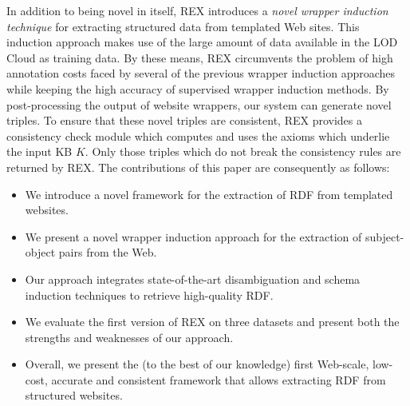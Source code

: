 In addition to being novel in itself, REX introduces a \emph{novel wrapper induction technique} for extracting structured data from templated Web sites. 
This induction approach makes use of the large amount of data available in the \ac{LOD} Cloud as training data. 
By these means, REX circumvents the problem of high annotation costs faced by several of the previous wrapper induction approaches~\cite{flesca2004web,Hogue:2005:TAU:1060745.1060762} while keeping the high accuracy of supervised wrapper induction methods. 
By post-processing the output of website wrappers, our system can generate novel triples. 
To ensure that these novel triples are consistent, REX provides a consistency check module which computes and uses the axioms which underlie the input  \ac{KB} $K$. 
Only those triples which do not break the consistency rules are returned by REX. 
The contributions of this paper are consequently as follows:
\begin{itemize}
\item We introduce a novel framework for the extraction of \ac{RDF} from templated websites.
\item We present a novel wrapper induction approach for the extraction of subject-object pairs from the Web.
\item Our approach integrates state-of-the-art disambiguation and schema induction techniques to retrieve high-quality \ac{RDF}. 
\item We evaluate the first version of REX on three datasets and present both the strengths and weaknesses of our approach.
\item Overall, we present the (to the best of our knowledge) first Web-scale, low-cost, accurate and consistent framework that allows extracting \ac{RDF} from structured websites.
\end{itemize}

